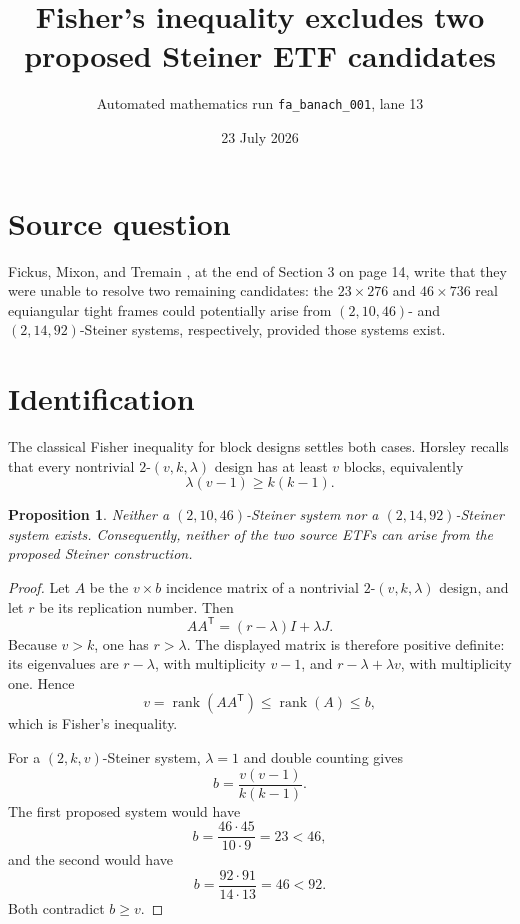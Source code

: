\documentclass[11pt]{article}
\title{\textcolor{blue!55!black}{Fisher's inequality excludes two proposed
Steiner ETF candidates}}
\author{Automated mathematics run \texttt{fa\_banach\_001}, lane 13}
\date{23 July 2026}
\newtheorem{proposition}{Proposition}
\begin{document}
\maketitle

\noindent{}

\section{Source question}

Fickus, Mixon, and Tremain \cite{FMT}, at the end of Section 3 on page 14,
write that they were unable to resolve two remaining candidates:
the \(23\times276\) and \(46\times736\) real equiangular tight frames could
potentially arise from \((2,10,46)\)- and \((2,14,92)\)-Steiner systems,
respectively, provided those systems exist.

\section{Identification}

The classical Fisher inequality for block designs settles both cases.
Horsley \cite[p.~2]{Horsley} recalls that every nontrivial
\(2\)-\((v,k,\lambda)\) design has at least \(v\) blocks, equivalently
\[
 \lambda(v-1)\geq k(k-1).
\]

\begin{proposition}
Neither a \((2,10,46)\)-Steiner system nor a
\((2,14,92)\)-Steiner system exists.  Consequently, neither of the two
source ETFs can arise from the proposed Steiner construction.
\end{proposition}

\begin{proof}
Let \(A\) be the \(v\times b\) incidence matrix of a nontrivial
\(2\)-\((v,k,\lambda)\) design, and let \(r\) be its replication number.
Then
\[
 AA^{\mathsf T}=(r-\lambda)I+\lambda J.
\]
Because \(v>k\), one has \(r>\lambda\).  The displayed matrix is therefore
positive definite: its eigenvalues are \(r-\lambda\), with multiplicity
\(v-1\), and \(r-\lambda+\lambda v\), with multiplicity one.  Hence
\[
 v=\operatorname{rank}(AA^{\mathsf T})
 \leq \operatorname{rank}(A)\leq b,
\]
which is Fisher's inequality.

For a \((2,k,v)\)-Steiner system, \(\lambda=1\) and double counting gives
\[
 b=\frac{v(v-1)}{k(k-1)}.
\]
The first proposed system would have
\[
 b=\frac{46\cdot45}{10\cdot9}=23<46,
\]
and the second would have
\[
 b=\frac{92\cdot91}{14\cdot13}=46<92.
\]
Both contradict \(b\geq v\).
\end{proof}
\end{document}
